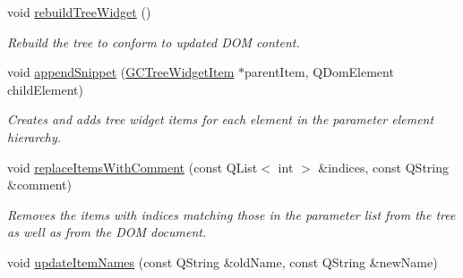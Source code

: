\begin{DoxyCompactItemize}
void \hyperlink{class_g_c_dom_tree_widget_a0ac81800aa6d507dd17cbffa6814a632}{rebuild\-Tree\-Widget} ()
\begin{DoxyCompactList}\small\item\em \-Rebuild the tree to conform to updated \-D\-O\-M content. \end{DoxyCompactList}\item 
void \hyperlink{class_g_c_dom_tree_widget_afdf29124d6e6cc6061f5e9978c6a7f81}{append\-Snippet} (\hyperlink{class_g_c_tree_widget_item}{\-G\-C\-Tree\-Widget\-Item} $\ast$parent\-Item, \-Q\-Dom\-Element child\-Element)
\begin{DoxyCompactList}\small\item\em \-Creates and adds tree widget items for each element in the parameter element hierarchy. \end{DoxyCompactList}\item 
void \hyperlink{class_g_c_dom_tree_widget_a0badfb9fc7250c5186fb9575019c335f}{replace\-Items\-With\-Comment} (const \-Q\-List$<$ int $>$ \&indices, const \-Q\-String \&comment)
\begin{DoxyCompactList}\small\item\em \-Removes the items with indices matching those in the parameter list from the tree as well as from the \-D\-O\-M document. \end{DoxyCompactList}\item 
\hypertarget{class_g_c_dom_tree_widget_a1ec3ed3851e25adf1fac93fb42a4a8a7}{void \hyperlink{class_g_c_dom_tree_widget_a1ec3ed3851e25adf1fac93fb42a4a8a7}{update\-Item\-Names} (const \-Q\-String \&old\-Name, const \-Q\-String \&new\-Name)}\label{class_g_c_dom_tree_widget_a1ec3ed3851e25adf1fac93fb42a4a8a7}


\end{DoxyCompactItemize}
